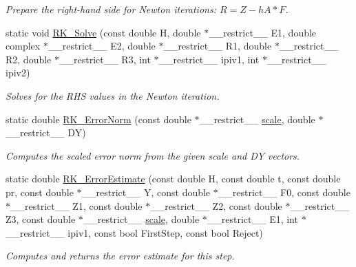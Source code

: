 \begin{DoxyCompactItemize}
\begin{DoxyCompactList}\small\item\em Prepare the right-\/hand side for Newton iterations\+: $R = Z - hA * F$. \end{DoxyCompactList}\item 
static void \hyperlink{namespaceradau2a_ab9dfab43bd32440af1158bad0d91ade3}{R\+K\+\_\+\+Solve} (const double H, double $\ast$\+\_\+\+\_\+restrict\+\_\+\+\_\+ E1, double complex $\ast$\+\_\+\+\_\+restrict\+\_\+\+\_\+ E2, double $\ast$\+\_\+\+\_\+restrict\+\_\+\+\_\+ R1, double $\ast$\+\_\+\+\_\+restrict\+\_\+\+\_\+ R2, double $\ast$\+\_\+\+\_\+restrict\+\_\+\+\_\+ R3, int $\ast$\+\_\+\+\_\+restrict\+\_\+\+\_\+ ipiv1, int $\ast$\+\_\+\+\_\+restrict\+\_\+\+\_\+ ipiv2)
\begin{DoxyCompactList}\small\item\em Solves for the R\+HS values in the Newton iteration. \end{DoxyCompactList}\item 
static double \hyperlink{namespaceradau2a_a3218b6d64f48cecafb78c71318c1ee9b}{R\+K\+\_\+\+Error\+Norm} (const double $\ast$\+\_\+\+\_\+restrict\+\_\+\+\_\+ \hyperlink{namespaceradau2a_ad92aba1b979853cd2b6102916a402904}{scale}, double $\ast$\+\_\+\+\_\+restrict\+\_\+\+\_\+ DY)
\begin{DoxyCompactList}\small\item\em Computes the scaled error norm from the given {\ttfamily scale} and {\ttfamily DY} vectors. \end{DoxyCompactList}\item 
static double \hyperlink{namespaceradau2a_ac00b7bbdb38b0af9ab59a19bc1f5b3f9}{R\+K\+\_\+\+Error\+Estimate} (const double H, const double t, const double pr, const double $\ast$\+\_\+\+\_\+restrict\+\_\+\+\_\+ Y, const double $\ast$\+\_\+\+\_\+restrict\+\_\+\+\_\+ F0, const double $\ast$\+\_\+\+\_\+restrict\+\_\+\+\_\+ Z1, const double $\ast$\+\_\+\+\_\+restrict\+\_\+\+\_\+ Z2, const double $\ast$\+\_\+\+\_\+restrict\+\_\+\+\_\+ Z3, const double $\ast$\+\_\+\+\_\+restrict\+\_\+\+\_\+ \hyperlink{namespaceradau2a_ad92aba1b979853cd2b6102916a402904}{scale}, double $\ast$\+\_\+\+\_\+restrict\+\_\+\+\_\+ E1, int $\ast$\+\_\+\+\_\+restrict\+\_\+\+\_\+ ipiv1, const bool First\+Step, const bool Reject)
\begin{DoxyCompactList}\small\item\em Computes and returns the error estimate for this step. \end{DoxyCompactList}\item 

\end{DoxyCompactItemize}

